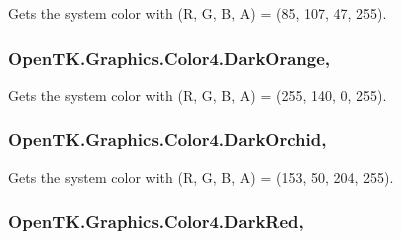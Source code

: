 Gets the system color with (R, G, B, A) = (85, 107, 47, 255). 

\hypertarget{struct_open_t_k_1_1_graphics_1_1_color4_ac69a43daa561d7ed112dc5ec042bc72d}{
\subsubsection[{Dark\-Orange}]{ Open\-T\-K.\-Graphics.\-Color4.\-Dark\-Orange\hspace{0.3cm}{\ttfamily [static]}, {\ttfamily [get]}}}\label{struct_open_t_k_1_1_graphics_1_1_color4_ac69a43daa561d7ed112dc5ec042bc72d}


Gets the system color with (R, G, B, A) = (255, 140, 0, 255). 

\hypertarget{struct_open_t_k_1_1_graphics_1_1_color4_a8a1348cee63a98936328160d9c38e74d}{
\subsubsection[{Dark\-Orchid}]{ Open\-T\-K.\-Graphics.\-Color4.\-Dark\-Orchid\hspace{0.3cm}{\ttfamily [static]}, {\ttfamily [get]}}}\label{struct_open_t_k_1_1_graphics_1_1_color4_a8a1348cee63a98936328160d9c38e74d}


Gets the system color with (R, G, B, A) = (153, 50, 204, 255). 

\hypertarget{struct_open_t_k_1_1_graphics_1_1_color4_a3c1436f18ff409a9d11a7bbf822847bb}{
\subsubsection[{Dark\-Red}]{ Open\-T\-K.\-Graphics.\-Color4.\-Dark\-Red\hspace{0.3cm}{\ttfamily [static]}, {\ttfamily [get]}}}\label{struct_open_t_k_1_1_graphics_1_1_color4_a3c1436f18ff409a9d11a7bbf822847bb}


